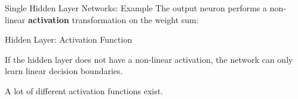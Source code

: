 \documentclass[11pt,compress,t,notes=noshow, xcolor=table]{beamer}
\begin{document}
\begin{frame} {Single Hidden Layer Networks: Example}
The output neuron performs a non-linear \textbf{activation} transformation on the weight sum:
\begin{figure}
\centering
{}
\end{figure}
\end{frame}
\begin{framei} {Hidden Layer: Activation Function}
\item If the hidden layer does not have a non-linear activation, the network can only learn linear decision boundaries.
\item A lot of different activation functions exist.
\end{framei}
\end{document}
